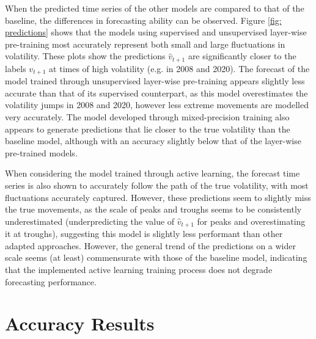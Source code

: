 \documentclass[a4paper, 11pt]{report}
\begin{document}
    When the predicted time series of the other models are compared to that of the baseline, the differences in forecasting ability can be observed. Figure \ref{fig: predictions} shows that the models using supervised and unsupervised layer-wise pre-training most accurately represent both small and large fluctuations in volatility. These plots show the predictions $\hat{v}_{t+1}$ are significantly closer to the labels $v_{t+1}$ at times of high volatility (e.g. in 2008 and 2020). The forecast of the model trained through unsupervised layer-wise pre-training appears slightly less accurate than that of its supervised counterpart, as this model overestimates the volatility jumps in 2008 and 2020, however less extreme movements are modelled very accurately. The model developed through mixed-precision training also appears to generate predictions that lie closer to the true volatility than the baseline model, although with an accuracy slightly below that of the layer-wise pre-trained models.

    When considering the model trained through active learning, the forecast time series is also shown to accurately follow the path of the true volatility, with most fluctuations accurately captured. However, these predictions seem to slightly miss the true movements, as the scale of peaks and troughs seems to be consistently underestimated (underpredicting the value of $\hat{v}_{t+1}$ for peaks and overestimating it at troughs), suggesting this model is slightly less performant than other adapted approaches. However, the general trend of the predictions on a wider scale seems (at least) commensurate with those of the baseline model, indicating that the implemented active learning training process does not degrade forecasting performance.


    \section{Accuracy Results}
\end{document}
